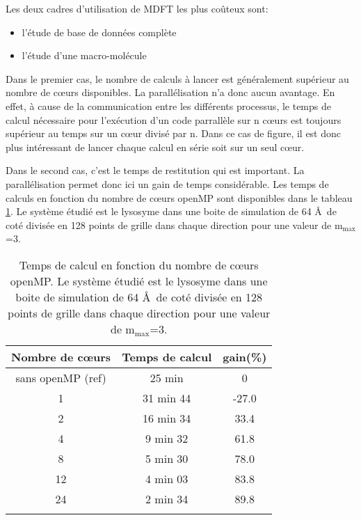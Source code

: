 Les deux cadres d'utilisation de MDFT les plus coûteux sont:
\begin{itemize}
\item l'étude de base de données complète
\item l'étude d'une macro-molécule
\end{itemize}

Dans le premier cas, le nombre de calculs à lancer est généralement supérieur au nombre de cœurs disponibles. La parallélisation n'a donc aucun avantage. En effet, à cause de la communication entre les différents processus, le temps de calcul nécessaire pour l’exécution d'un code parrallèle sur n cœurs est toujours supérieur au temps sur un cœur divisé par n. Dans ce cas de figure, il est donc plus intéressant de lancer chaque calcul en série soit sur un seul cœur.

Dans le second cas, c'est le temps de restitution qui est important. La parallélisation permet donc ici un gain de temps considérable. Les temps de calculs en fonction du nombre de cœurs openMP sont disponibles dans le tableau \ref{tab:perf_minimiseurs}. Le système étudié est le lysosyme dans une boite de simulation de 64 \AA\ de coté divisée en 128 points de grille dans chaque direction pour une valeur de $\mathrm{m}_\mathrm{max}$=3.



\begin{table}[H]
 \centering
  \begin{tabular}{ c | c | c }
      Nombre de cœurs & Temps de calcul & gain(\%)\\
    \hline
    sans openMP (ref) & 25 min & 0\\
     1 & 31 min 44 & -27.0 \\
     2 & 16 min 34 &  33.4 \\
     4 &  9 min 32 &  61.8 \\
     8 &  5 min 30 &  78.0 \\
    12 &  4 min 03 &  83.8 \\
    24 &  2 min 34 &  89.8 \\
    \hline \multicolumn{3}{c}{} \\[-1em]\hline
  \end{tabular}
  \caption[Temps de calcul en fonction du nombre de cœurs openMP.]{Temps de calcul en fonction du nombre de cœurs openMP. Le système étudié est le lysosyme dans une boite de simulation de 64 \AA\ de coté divisée en 128 points de grille dans chaque direction pour une valeur de $\mathrm{m}_\mathrm{max}$=3.}
  \label{tab:perf_minimiseurs}  
\end{table}

